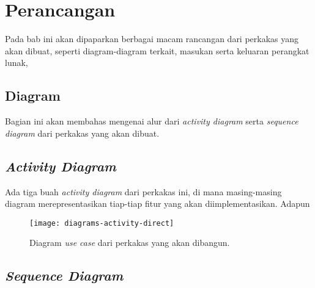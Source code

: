 \chapter{Perancangan}
\label{chap:design}

Pada bab ini akan dipaparkan berbagai macam rancangan dari perkakas \cl yang akan dibuat, seperti diagram-diagram terkait, masukan serta keluaran perangkat lunak,

\section{Diagram}
\label{sec:analysis-diagrams}

Bagian ini akan membahas mengenai alur dari \textit{activity diagram} serta \textit{sequence diagram} dari perkakas yang akan dibuat.

\section{\textit{Activity Diagram}}
\label{sec:design-diagrams-activity}

Ada tiga buah \textit{activity diagram} dari perkakas ini, di mana masing-masing diagram merepresentasikan tiap-tiap fitur yang akan diimplementasikan. Adapun 

\begin{figure}[ht]
    \centering
    \texttt{[image: diagrams-activity-direct]}
    \caption[Diagram \textit{use case} perkakas yang akan dibangun]{Diagram \textit{use case} dari perkakas yang akan dibangun.}
    \label{fig:diagrams-activity-direct}
\end{figure}

\section{\textit{Sequence Diagram}}
\label{sec:design-diagrams-sequence}
